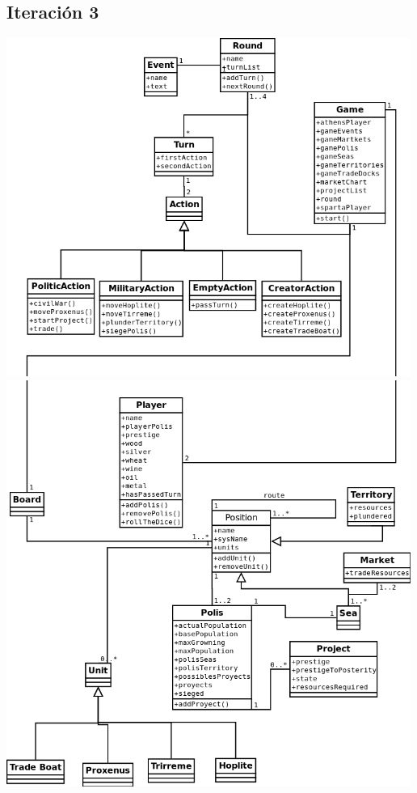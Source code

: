 \documentclass[11 pt]{book}
\begin{document}
	\subsection*{Iteración 3}
		\begin{center}
			\includegraphics[width=500px]{analysis-uml/iteration3/part1.png}
			\includegraphics[width=500px]{analysis-uml/iteration3/part2.png}
		\end{center}
	
\end{document}
